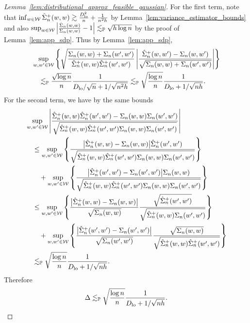 \begin{proof}[Lemma~\ref{lem:distributional_approx_feasible_gaussian}]
  For the first term, note that
  $\inf_{w \in \mathcal{W}} \hat \Sigma_n^+(w,w)
  \gtrsim \frac{D_{\textup{lo}}^2}{n} + \frac{1}{n^2h}$
  by Lemma~\ref{lem:variance_estimator_bounds} and also
  $\sup_{w \in \mathcal{W}}
  \left|\frac{\hat \Sigma_n(w,w)}{\Sigma_n(w,w)} - 1\right|
  \lesssim_{\mathbb{P}} \sqrt{h \log n}$
  by the proof of Lemma~\ref{lem:app_sdp}.
  Thus by Lemma~\ref{lem:app_sdp},
  \begin{align*}
    &\sup_{w, w' \in \mathcal{W}}
    \left\{
      \sqrt{\frac{\Sigma_n(w,w) + \Sigma_n(w',w')}
      {\hat \Sigma_n^+(w,w) \hat \Sigma_n^+(w',w')}}
      \left|
      \frac{\hat \Sigma_n^+(w,w') - \Sigma_n(w,w')}
      {\sqrt{\Sigma_n(w,w) + \Sigma_n(w',w')}}
      \right|
    \right\} \\
    &\quad\lesssim_{\mathbb{P}}
    \frac{\sqrt{\log n}}{n}
    \frac{1}{D_{\textup{lo}}/\sqrt{n} + 1/\sqrt{n^2h}}
    \lesssim_{\mathbb{P}}
    \sqrt{\frac{\log n}{n}}
    \frac{1}{D_{\textup{lo}} + 1/\sqrt{n h}}.
  \end{align*}
  For the second term, we have by the same bounds
  \begin{align*}
    &\sup_{w, w' \in \mathcal{W}}
    \left|
    \frac{\hat \Sigma_n^+(w,w) \hat \Sigma_n^+(w',w')
    - \Sigma_n(w,w) \Sigma_n(w',w')}
    {\sqrt{\hat \Sigma_n^+(w,w) \hat \Sigma_n^+(w',w')
    \Sigma_n(w,w) \Sigma_n(w',w')}}
    \right| \\
    &\quad\leq
    \sup_{w, w' \in \mathcal{W}}
    \left\{
      \frac{\big| \hat \Sigma_n^+(w,w) - \Sigma_n(w,w)\big|
      \hat \Sigma_n^+(w',w')}
      {\sqrt{\hat \Sigma_n^+(w,w) \hat \Sigma_n^+(w',w')
      \Sigma_n(w,w) \Sigma_n(w',w')}}
    \right\} \\
    &\qquad+
    \sup_{w, w' \in \mathcal{W}}
    \left\{
      \frac{\big| \hat \Sigma_n^+(w',w') - \Sigma_n(w',w')\big|
      \Sigma_n(w,w)}
      {\sqrt{\hat \Sigma_n^+(w,w) \hat \Sigma_n^+(w',w')
      \Sigma_n(w,w) \Sigma_n(w',w')}}
    \right\} \\
    &\quad\leq
    \sup_{w, w' \in \mathcal{W}}
    \left\{
      \frac{\big| \hat \Sigma_n^+(w,w) - \Sigma_n(w,w)\big|}
      {\sqrt{\Sigma_n(w,w)}}
      \frac{\sqrt{\hat \Sigma_n^+(w',w')}}
      {\sqrt{\hat \Sigma_n^+(w,w) \Sigma_n(w',w')}}
    \right\} \\
    &\qquad+
    \sup_{w, w' \in \mathcal{W}}
    \left\{
      \frac{\big| \hat \Sigma_n^+(w',w') - \Sigma_n(w',w')\big|}
      {\sqrt{\Sigma_n(w',w')}}
      \frac{\sqrt{\Sigma_n(w,w)}}
      {\sqrt{\hat \Sigma_n^+(w,w) \hat \Sigma_n^+(w',w')}}
    \right\} \\
    &\quad\lesssim_{\mathbb{P}}
    \sqrt{\frac{\log n}{n}}
    \frac{1}{D_{\textup{lo}} + 1/\sqrt{n h}}.
  \end{align*}
  Therefore
  \begin{align*}
    \Delta \lesssim_{\mathbb{P}}
    \sqrt{\frac{\log n}{n}}
    \frac{1}{D_{\textup{lo}} + 1/\sqrt{n h}}.
  \end{align*}


\end{proof}
